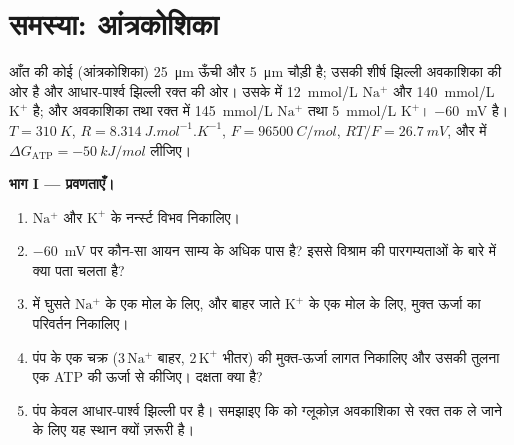 \section{समस्या: आंत्रकोशिका}

\begin{problem}
\label{pb:b1:membranes-transport:1}
आँत की कोई   (आंत्रकोशिका) \qty{25}{\micro m} ऊँची और
\qty{5}{\micro m} चौड़ी है; उसकी शीर्ष झिल्ली अवकाशिका की ओर है और
आधार-पार्श्व झिल्ली रक्त की ओर। उसके  में \qty{12}{mmol/L}
$\mathrm{Na^+}$ और \qty{140}{mmol/L} $\mathrm{K^+}$ है; और अवकाशिका तथा
रक्त में \qty{145}{mmol/L} $\mathrm{Na^+}$ तथा \qty{5}{mmol/L}
$\mathrm{K^+}$।  \qty{-60}{mV} है।
$T = \qty{310}{K}$, $R = \qty{8.314}{J.mol^{-1}.K^{-1}}$,
$F = \qty{96500}{C/mol}$, $RT/F = \qty{26.7}{mV}$, और  में
$\Delta G_{\text{ATP}} = \qty{-50}{kJ/mol}$ लीजिए।

\medskip
\noindent\textbf{भाग I --- प्रवणताएँ।}
\begin{enumerate}
  \item $\mathrm{Na^+}$ और $\mathrm{K^+}$ के नर्न्स्ट विभव निकालिए।
  \item \qty{-60}{mV} पर कौन-सा आयन साम्य के अधिक पास है? इससे विश्राम
        की पारगम्यताओं के बारे में क्या पता चलता है?
  \item {} में घुसते $\mathrm{Na^+}$ के एक मोल के लिए, और बाहर
        जाते $\mathrm{K^+}$ के एक मोल के लिए, मुक्त ऊर्जा का परिवर्तन
        निकालिए।
  \item पंप के एक चक्र ($3\,\mathrm{Na^+}$ बाहर, $2\,\mathrm{K^+}$
        भीतर) की मुक्त-ऊर्जा लागत निकालिए और उसकी तुलना एक ATP की ऊर्जा
        से कीजिए। दक्षता क्या है?
  \item पंप केवल आधार-पार्श्व झिल्ली पर है। समझाइए कि  को
        ग्लूकोज़ अवकाशिका से रक्त तक ले जाने के लिए यह स्थान क्यों
        ज़रूरी है।
\end{enumerate}


\end{problem}
